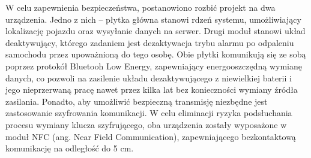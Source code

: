 W celu zapewnienia bezpieczeństwa, postanowiono rozbić projekt na dwa urządzenia. Jedno z nich – płytka główna stanowi rdzeń systemu, umożliwiający lokalizację pojazdu oraz wysyłanie danych na serwer. Drugi moduł stanowi układ deaktywujący, którego zadaniem jest dezaktywacja trybu alarmu po odpaleniu samochodu przez upoważnioną do tego osobę. Obie płytki komunikują się ze sobą poprzez protokół Bluetooh Low Energy, zapewniający energooszczędną wymianę danych, co pozwoli na zasilenie układu dezaktywującego z niewielkiej baterii i jego nieprzerwaną pracę nawet przez kilka lat bez konieczności wymiany źródła zasilania. 
Ponadto, aby umożliwić  bezpieczną transmisję niezbędne jest zastosowanie szyfrowania komunikacji. W celu eliminacji ryzyka podsłuchania procesu wymiany klucza szyfrującego, oba urządzenia zostały wyposażone w moduł NFC (ang. Near Field Communication), zapewniającego bezkontaktową komunikację na odległość do 5 cm.